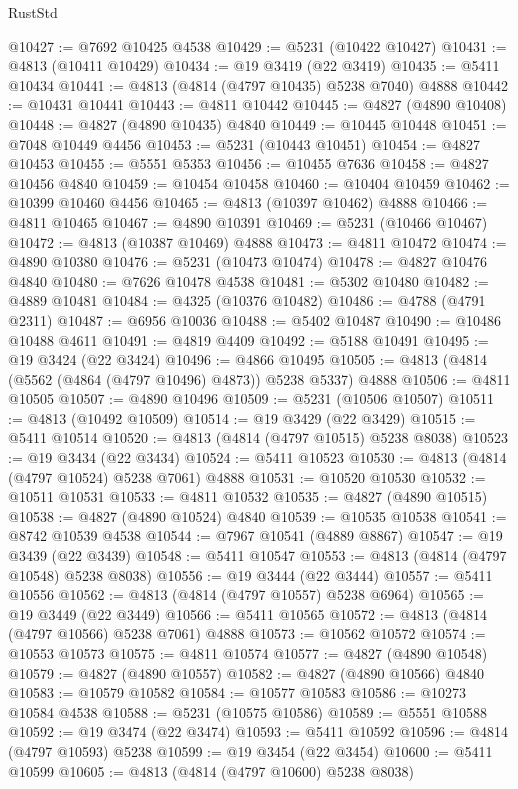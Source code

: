 \begin{lexlean}{RustStd}
\begin{coremodule}
@10427 := @7692 @10425 @4538
@10429 := @5231 (@10422 @10427)
@10431 := @4813 (@10411 @10429)
@10434 := @19 @3419 (@22 @3419)
@10435 := @5411 @10434
@10441 := @4813 (@4814 (@4797 @10435) @5238 @7040) @4888
@10442 := @10431 @10441
@10443 := @4811 @10442
@10445 := @4827 (@4890 @10408)
@10448 := @4827 (@4890 @10435) @4840
@10449 := @10445 @10448
@10451 := @7048 @10449 @4456
@10453 := @5231 (@10443 @10451)
@10454 := @4827 @10453
@10455 := @5551 @5353
@10456 := @10455 @7636
@10458 := @4827 @10456 @4840
@10459 := @10454 @10458
@10460 := @10404 @10459
@10462 := @10399 @10460 @4456
@10465 := @4813 (@10397 @10462) @4888
@10466 := @4811 @10465
@10467 := @4890 @10391
@10469 := @5231 (@10466 @10467)
@10472 := @4813 (@10387 @10469) @4888
@10473 := @4811 @10472
@10474 := @4890 @10380
@10476 := @5231 (@10473 @10474)
@10478 := @4827 @10476 @4840
@10480 := @7626 @10478 @4538
@10481 := @5302 @10480
@10482 := @4889 @10481
@10484 := @4325 (@10376 @10482)
@10486 := @4788 (@4791 @2311)
@10487 := @6956 @10036
@10488 := @5402 @10487
@10490 := @10486 @10488 @4611
@10491 := @4819 @4409
@10492 := @5188 @10491
@10495 := @19 @3424 (@22 @3424)
@10496 := @4866 @10495
@10505 := @4813 (@4814 (@5562 (@4864 (@4797 @10496) @4873)) @5238 @5337) @4888
@10506 := @4811 @10505
@10507 := @4890 @10496
@10509 := @5231 (@10506 @10507)
@10511 := @4813 (@10492 @10509)
@10514 := @19 @3429 (@22 @3429)
@10515 := @5411 @10514
@10520 := @4813 (@4814 (@4797 @10515) @5238 @8038)
@10523 := @19 @3434 (@22 @3434)
@10524 := @5411 @10523
@10530 := @4813 (@4814 (@4797 @10524) @5238 @7061) @4888
@10531 := @10520 @10530
@10532 := @10511 @10531
@10533 := @4811 @10532
@10535 := @4827 (@4890 @10515)
@10538 := @4827 (@4890 @10524) @4840
@10539 := @10535 @10538
@10541 := @8742 @10539 @4538
@10544 := @7967 @10541 (@4889 @8867)
@10547 := @19 @3439 (@22 @3439)
@10548 := @5411 @10547
@10553 := @4813 (@4814 (@4797 @10548) @5238 @8038)
@10556 := @19 @3444 (@22 @3444)
@10557 := @5411 @10556
@10562 := @4813 (@4814 (@4797 @10557) @5238 @6964)
@10565 := @19 @3449 (@22 @3449)
@10566 := @5411 @10565
@10572 := @4813 (@4814 (@4797 @10566) @5238 @7061) @4888
@10573 := @10562 @10572
@10574 := @10553 @10573
@10575 := @4811 @10574
@10577 := @4827 (@4890 @10548)
@10579 := @4827 (@4890 @10557)
@10582 := @4827 (@4890 @10566) @4840
@10583 := @10579 @10582
@10584 := @10577 @10583
@10586 := @10273 @10584 @4538
@10588 := @5231 (@10575 @10586)
@10589 := @5551 @10588
@10592 := @19 @3474 (@22 @3474)
@10593 := @5411 @10592
@10596 := @4814 (@4797 @10593) @5238
@10599 := @19 @3454 (@22 @3454)
@10600 := @5411 @10599
@10605 := @4813 (@4814 (@4797 @10600) @5238 @8038)

\end{coremodule}
\end{lexlean}
